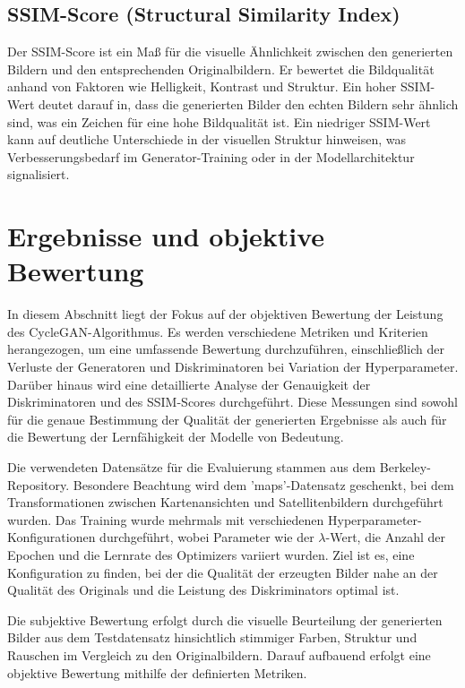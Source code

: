 \subsection{SSIM-Score (Structural Similarity Index)}
Der SSIM-Score ist ein Maß für die visuelle Ähnlichkeit zwischen den generierten Bildern und den entsprechenden Originalbildern. Er bewertet die Bildqualität anhand von Faktoren wie Helligkeit, Kontrast und Struktur. Ein hoher SSIM-Wert deutet darauf in, dass die generierten Bilder den echten Bildern sehr ähnlich sind, was ein Zeichen für eine hohe Bildqualität ist. Ein niedriger SSIM-Wert kann auf deutliche Unterschiede in der visuellen Struktur hinweisen, was Verbesserungsbedarf im Generator-Training oder in der Modellarchitektur signalisiert.

\section{Ergebnisse und objektive Bewertung}
In diesem Abschnitt liegt der Fokus auf der objektiven Bewertung der Leistung des CycleGAN-Algorithmus. Es werden verschiedene Metriken und Kriterien herangezogen, um eine umfassende Bewertung durchzuführen, einschließlich der Verluste der Generatoren und Diskriminatoren bei Variation der Hyperparameter. Darüber hinaus wird eine detaillierte Analyse der Genauigkeit der Diskriminatoren und des SSIM-Scores durchgeführt. Diese Messungen sind sowohl für die genaue Bestimmung der Qualität der generierten Ergebnisse als auch für die Bewertung der Lernfähigkeit der Modelle von Bedeutung.

Die verwendeten Datensätze für die Evaluierung stammen aus dem Berkeley-Repository. Besondere Beachtung wird dem 'maps'-Datensatz geschenkt, bei dem Transformationen zwischen Kartenansichten und Satellitenbildern durchgeführt wurden. Das Training wurde mehrmals mit verschiedenen Hyperparameter-\\Konfigurationen durchgeführt, wobei Parameter wie der $\lambda$-Wert, die Anzahl der Epochen und die Lernrate des Optimizers variiert wurden. Ziel ist es, eine Konfiguration zu finden, bei der die Qualität der erzeugten Bilder nahe an der Qualität des Originals und die Leistung des Diskriminators optimal ist.

Die subjektive Bewertung erfolgt durch die visuelle Beurteilung der generierten Bilder aus dem Testdatensatz hinsichtlich stimmiger Farben, Struktur und Rauschen im Vergleich zu den Originalbildern. Darauf aufbauend erfolgt eine objektive Bewertung mithilfe der definierten Metriken.


